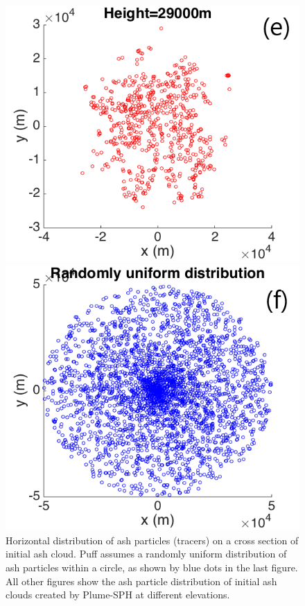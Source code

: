 \documentclass[utf8]{frontiersSCNS} %
\begin{document}
\begin{figure}[!htb]
\begin{minipage}{.325 \textwidth}
\centering
\includegraphics[width=0.99 \textwidth]{Figures/Possion-H29km-ParticleDis-h}
\end{minipage}%
\begin{minipage}{.325 \textwidth}
\centering
\includegraphics[width=0.99 \textwidth]{Figures/Possion-RDU-ParticleDis-h}
\end{minipage}%
\caption{Horizontal distribution of ash particles (tracers) on a cross section of initial ash cloud. Puff assumes a randomly uniform distribution of ash particles within a circle, as shown by blue dots in the last figure. All other figures show the ash particle distribution of initial ash clouds created by Plume-SPH at different elevations.}
\label{fig:initial-cloud-horizontal}
\end{figure}
\end{document}
